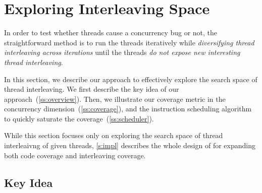 \section{Exploring Interleaving Space}
\label{s:design}










In order to test whether threads cause a concurrency bug or not, the
straightforward method is to run the threads iteratively while
\textit{diversifying thread interleaving across iterations} until the
threads \textit{do not expose new interesting thread interleaving}.


In this section, we describe our approach to effectively explore the
search space of thread interleaving.
%
We first describe the key idea of our
approach~(\autoref{ss:overview}). Then, we illustrate our coverage
metric in the concurrency dimension~(\autoref{ss:coverage}), and the
instruction scheduling algorithm to quickly saturate the
coverage~(\autoref{ss:scheduler}).



While this section focuses only on exploring the search space of
thread interleaivng of given threads, \autoref{s:impl} describes the
whole design of \sys for expanding both code coverage and interleaving
coverage.


\subsection{Key Idea}
\label{ss:overview}

